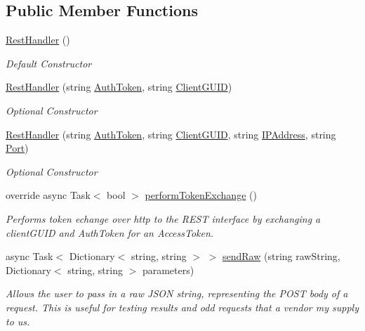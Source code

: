 \subsection*{Public Member Functions}
\begin{DoxyCompactItemize}
\item 
\mbox{\hyperlink{class_form_sim_1_1_rest_handler_a138f2e1c350d4a14c51a0a27d36a13a8}{Rest\+Handler}} ()
\begin{DoxyCompactList}\small\item\em Default Constructor \end{DoxyCompactList}\item 
\mbox{\hyperlink{class_form_sim_1_1_rest_handler_a5a8e7dca756d6fa97fc472c1145af5cf}{Rest\+Handler}} (string \mbox{\hyperlink{class_form_sim_1_1_generic_handler_a6699d8bfc9cd305baf30ab9413b21605}{Auth\+Token}}, string \mbox{\hyperlink{class_form_sim_1_1_generic_handler_ae1d2175b140f4c600d74bbab1e22714e}{Client\+G\+U\+ID}})
\begin{DoxyCompactList}\small\item\em Optional Constructor \end{DoxyCompactList}\item 
\mbox{\hyperlink{class_form_sim_1_1_rest_handler_a01f0a6ed0453bcdf536d4062650d5bbf}{Rest\+Handler}} (string \mbox{\hyperlink{class_form_sim_1_1_generic_handler_a6699d8bfc9cd305baf30ab9413b21605}{Auth\+Token}}, string \mbox{\hyperlink{class_form_sim_1_1_generic_handler_ae1d2175b140f4c600d74bbab1e22714e}{Client\+G\+U\+ID}}, string \mbox{\hyperlink{class_form_sim_1_1_generic_handler_a12b51dea082a4d40d86829802adf073b}{I\+P\+Address}}, string \mbox{\hyperlink{class_form_sim_1_1_generic_handler_ac6492bb3e4fbe8f66c97b00bd27020c1}{Port}})
\begin{DoxyCompactList}\small\item\em Optional Constructor \end{DoxyCompactList}\item 
override async Task$<$ bool $>$ \mbox{\hyperlink{class_form_sim_1_1_rest_handler_abd5c425be2b6c9e30ca3cfc0fb696aa9}{perform\+Token\+Exchange}} ()
\begin{DoxyCompactList}\small\item\em Performs token echange over http to the R\+E\+ST interface by exchanging a client\+G\+U\+ID and Auth\+Token for an Access\+Token. \end{DoxyCompactList}\item 
async Task$<$ Dictionary$<$ string, string $>$ $>$ \mbox{\hyperlink{class_form_sim_1_1_rest_handler_a4a777189e9e16dc9970fe8f2557555db}{send\+Raw}} (string raw\+String, Dictionary$<$ string, string $>$ parameters)
\begin{DoxyCompactList}\small\item\em Allows the user to pass in a raw J\+S\+ON string, representing the P\+O\+ST body of a request. This is useful for testing results and odd requests that a vendor my supply to us. \end{DoxyCompactList}\end{DoxyCompactItemize}
